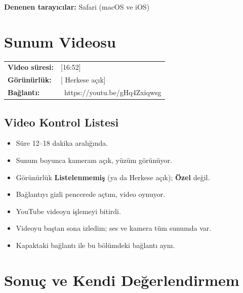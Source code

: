 \documentclass[12pt,a4paper]{article}
\begin{document}
\textbf{Denenen tarayıcılar:} Safari (macOS ve iOS)
\section{Sunum Videosu}
\begin{center}
\begin{tabular}{@{}ll@{}}
\textbf{Video süresi:} & [16:52] \\
\textbf{Görünürlük:} & [ Herkese açık] \\
\textbf{Bağlantı:} & \ https://youtu.be/gHq4Zxiqwsg \\
\end{tabular}
\end{center}

\subsection{Video Kontrol Listesi}
\begin{itemize}
  \item[$\boxtimes$] Süre 12--18 dakika aralığında.
  \item[$\boxtimes$] Sunum boyunca kameram açık, yüzüm görünüyor.
  \item[$\square$] Görünürlük \textbf{Listelenmemiş} (ya da Herkese açık); \textbf{Özel} değil.
  \item[$\square$] Bağlantıyı gizli pencerede açtım, video oynuyor.
  \item[$\boxtimes$] YouTube videoyu işlemeyi bitirdi.
  \item[$\boxtimes$] Videoyu baştan sona izledim; ses ve kamera tüm sunumda var.
  \item[$\boxtimes$] Kapaktaki bağlantı ile bu bölümdeki bağlantı aynı.
\end{itemize}

\section{Sonuç ve Kendi Değerlendirmem}
\end{document}
